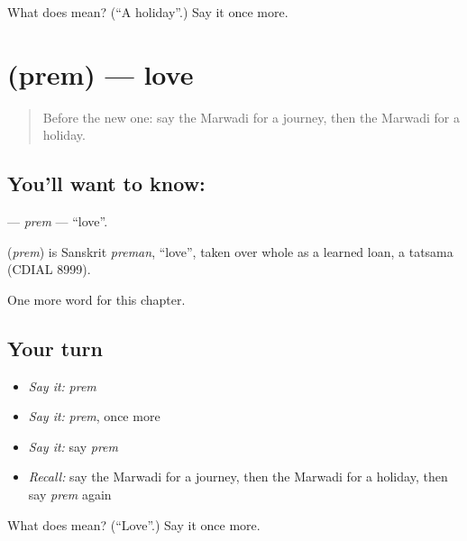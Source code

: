 \begin{tcolorbox}[breakable,colback=teal!4,colframe=teal!35!black,title={Before you move on}]
What does  mean? (\textquotedblleft{}A holiday\textquotedblright{}.) Say it once more.
\end{tcolorbox}
\section[\texorpdfstring{\mw{प्रेम} (prem)}{प्रेम (prem)}]{ (prem) — love}

\label{lesson:MW-C88-prem}



\begin{quote}
Before the new one: say the Marwadi for a journey, then the Marwadi for a holiday.
\end{quote}

\subsection*{You'll want to know: }
\textbf{} — \emph{prem} — \textquotedblleft{}love\textquotedblright{}.

\begin{cousinweb}
\textbf{} (\emph{prem}) is Sanskrit \emph{preman}, \textquotedblleft{}love\textquotedblright{}, taken over whole as a learned loan, a tatsama (CDIAL 8999).
\end{cousinweb}

\begin{grammarlens}[title={What you've built}]
One more word for this chapter.
\end{grammarlens}

\subsection*{Your turn}
\begin{itemize}
\raggedright
  \item \emph{Say it:} \emph{prem}
  \item \emph{Say it:} \emph{prem}, once more
  \item \emph{Say it:} say \emph{prem}
  \item \emph{Recall:} say the Marwadi for a journey, then the Marwadi for a holiday, then say \emph{prem} again
\end{itemize}

\begin{tcolorbox}[breakable,colback=teal!4,colframe=teal!35!black,title={Before you move on}]
What does  mean? (\textquotedblleft{}Love\textquotedblright{}.) Say it once more.
\end{tcolorbox}
